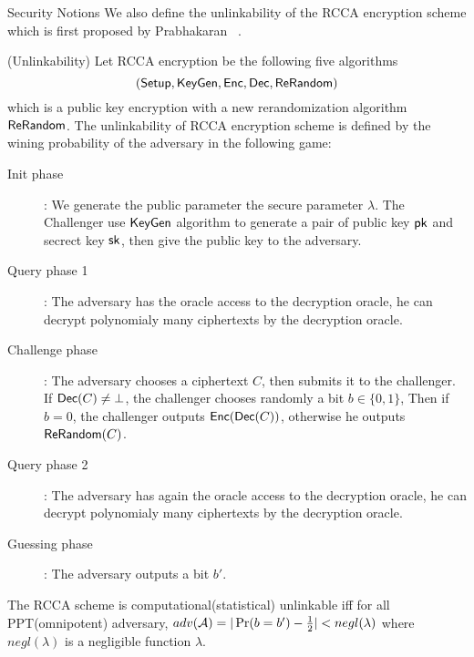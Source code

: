 \begin{subsection}{Security Notions}
  We also define the unlinkability of the RCCA encryption scheme which is first proposed by Prabhakaran \etal~\cite{DBLP:conf/crypto/PrabhakaranR07}.
  \begin{myDef}{(Unlinkability)}
    Let RCCA encryption be the following five algorithms
    $$({\mathsf{Setup}}, {\mathsf{KeyGen}}, {\mathsf{Enc}}, {\mathsf{Dec}}, {\mathsf{ReRandom}})$$
    which is a public key encryption with a new rerandomization algorithm ${\mathsf{ReRandom}}$.
    The unlinkability of RCCA encryption scheme is defined by the wining probability of the adversary in the following game:
    \begin{description}
    \item[Init phase]:
      We generate the public parameter \wrt the secure parameter $\lambda$. The Challenger use ${\mathsf{KeyGen}}$ algorithm to generate a pair of public key $\mathsf{pk}$ and secrect key $\mathsf{sk}$, then give the public key to the adversary.
    \item[Query phase 1]: The adversary has the oracle access to the decryption oracle, he can decrypt polynomialy many ciphertexts by the decryption oracle.
    \item[Challenge phase]: The adversary chooses a ciphertext $C$, then submits it to the challenger. If ${\mathsf{Dec}}(C)\neq \bot$, the challenger chooses randomly a bit $b \in \{0,1\}$, Then if $b = 0$, the challenger outputs ${\mathsf{Enc}}({\mathsf{Dec}}(C))$, otherwise he outputs ${\mathsf{ReRandom}}(C)$.
    \item[Query phase 2]: The adversary has again the oracle access to the decryption oracle, he can decrypt polynomialy many ciphertexts by the decryption oracle.
    \item[Guessing phase]: The adversary outputs a bit $b'$.
    \end{description}

    The RCCA scheme is computational(\resp statistical) unlinkable iff for all PPT(\resp omnipotent) adversary, $adv(\mathcal{A}) = |\operatorname{Pr}(b = b') - \frac{1}{2}| < negl(\lambda)$ where $negl(\lambda)$ is a negligible function \wrt $\lambda$. 
  \end{myDef}
  

\end{subsection}
